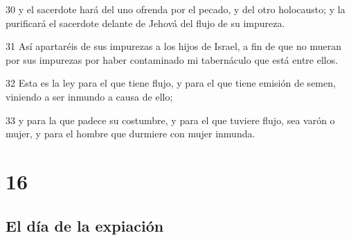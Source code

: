 \par 30 y el sacerdote hará del uno ofrenda por el pecado, y del otro holocausto; y la purificará el sacerdote delante de Jehová del flujo de su impureza.
\par 31 Así apartaréis de sus impurezas a los hijos de Israel, a fin de que no mueran por sus impurezas por haber contaminado mi tabernáculo que está entre ellos.
\par 32 Esta es la ley para el que tiene flujo, y para el que tiene emisión de semen, viniendo a ser inmundo a causa de ello;
\par 33 y para la que padece su costumbre, y para el que tuviere flujo, sea varón o mujer, y para el hombre que durmiere con mujer inmunda.

\chapter{16}

\section*{El día de la expiación}

